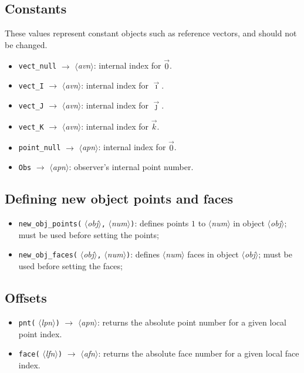 \documentclass[nonumber,harvardcite]{ltugboat}
\DeclareRobustCommand\meta[1]{%
       \ensuremath{\langle}\emph{#1}\ensuremath{\rangle}}
\newcommand{\AVN}{\meta{avn}}
\newcommand{\APN}{\meta{apn}}
\newcommand{\LPN}{\meta{lpn}}
\newcommand{\AFN}{\meta{afn}}
\newcommand{\LFN}{\meta{lfn}}
\newcommand{\IN}{\meta{obj}}
\newcommand{\NUM}{\meta{num}}
\newcommand{\tc}{\texttt{,}}
\begin{document}
\subsection{Constants}

These values represent constant objects such
as reference vectors, and should not be changed.

\begin{itemize}
\item \verb|vect_null| $\rightarrow$ \AVN: internal index for $\vec0$.
\item \verb|vect_I| $\rightarrow$ \AVN: internal index for $\vec\imath$.
\item \verb|vect_J| $\rightarrow$ \AVN: internal index for $\vec\jmath$.
\item \verb|vect_K| $\rightarrow$ \AVN: internal index for $\vec k$.
\item \verb|point_null| $\rightarrow$ \APN: internal index for $\vec0$.
\item \verb|Obs| $\rightarrow$ \APN: observer's internal point number.
\end{itemize}

\subsection{Defining new object points and faces}

\begin{itemize}
\item \verb|new_obj_points(|\IN\tc\NUM\verb|)|: 
      defines points $1$ to \NUM{} in object \IN; must be used before setting 
      the points;
\item \verb|new_obj_faces(|\IN\tc\NUM\verb|)|: 
      defines \NUM{} faces in object \IN; must be used before setting 
      the faces;
\end{itemize}

\subsection{Offsets}

\begin{itemize}
\item \verb|pnt(|\LPN\verb|)| $\rightarrow$ \APN: returns the absolute point 
number for a given local point index. 
\item \verb|face(|\LFN\verb|)| $\rightarrow$ \AFN: returns the absolute face
number for a given local face index. 
\end{itemize}
\end{document}
